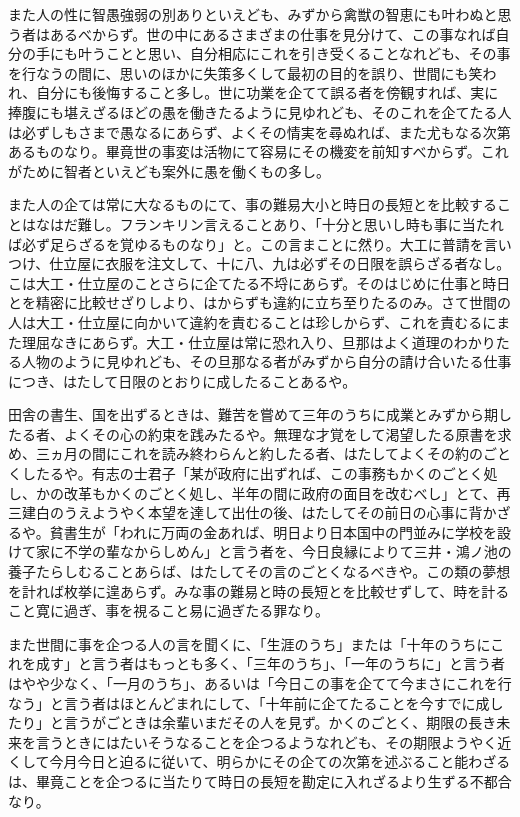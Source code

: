 \documentclass[a4paper, platex, dvipdfmx]{jsarticle}
\begin{document}
また人の性に智愚強弱の別ありといえども、みずから禽獣の智恵にも叶わぬと思う者はあるべからず。世の中にあるさまざまの仕事を見分けて、この事なれば自分の手にも叶うことと思い、自分相応にこれを引き受くることなれども、その事を行なうの間に、思いのほかに失策多くして最初の目的を誤り、世間にも笑われ、自分にも後悔すること多し。世に功業を企てて誤る者を傍観すれば、実に捧腹にも堪えざるほどの愚を働きたるように見ゆれども、そのこれを企てたる人は必ずしもさまで愚なるにあらず、よくその情実を尋ぬれば、また尤もなる次第あるものなり。畢竟世の事変は活物にて容易にその機変を前知すべからず。これがために智者といえども案外に愚を働くもの多し。

また人の企ては常に大なるものにて、事の難易大小と時日の長短とを比較することはなはだ難し。フランキリン言えることあり、「十分と思いし時も事に当たれば必ず足らざるを覚ゆるものなり」と。この言まことに然り。大工に普請を言いつけ、仕立屋に衣服を注文して、十に八、九は必ずその日限を誤らざる者なし。こは大工・仕立屋のことさらに企てたる不埒にあらず。そのはじめに仕事と時日とを精密に比較せざりしより、はからずも違約に立ち至りたるのみ。さて世間の人は大工・仕立屋に向かいて違約を責むることは珍しからず、これを責むるにまた理屈なきにあらず。大工・仕立屋は常に恐れ入り、旦那はよく道理のわかりたる人物のように見ゆれども、その旦那なる者がみずから自分の請け合いたる仕事につき、はたして日限のとおりに成したることあるや。

田舎の書生、国を出ずるときは、難苦を嘗めて三年のうちに成業とみずから期したる者、よくその心の約束を践みたるや。無理な才覚をして渇望したる原書を求め、三ヵ月の間にこれを読み終わらんと約したる者、はたしてよくその約のごとくしたるや。有志の士君子「某が政府に出ずれば、この事務もかくのごとく処し、かの改革もかくのごとく処し、半年の間に政府の面目を改むべし」とて、再三建白のうえようやく本望を達して出仕の後、はたしてその前日の心事に背かざるや。貧書生が「われに万両の金あれば、明日より日本国中の門並みに学校を設けて家に不学の輩なからしめん」と言う者を、今日良縁によりて三井・鴻ノ池の養子たらしむることあらば、はたしてその言のごとくなるべきや。この類の夢想を計れば枚挙に遑あらず。みな事の難易と時の長短とを比較せずして、時を計ること寛に過ぎ、事を視ること易に過ぎたる罪なり。

また世間に事を企つる人の言を聞くに、「生涯のうち」または「十年のうちにこれを成す」と言う者はもっとも多く、「三年のうち」、「一年のうちに」と言う者はやや少なく、「一月のうち」、あるいは「今日この事を企てて今まさにこれを行なう」と言う者はほとんどまれにして、「十年前に企てたることを今すでに成したり」と言うがごときは余輩いまだその人を見ず。かくのごとく、期限の長き未来を言うときにはたいそうなることを企つるようなれども、その期限ようやく近くして今月今日と迫るに従いて、明らかにその企ての次第を述ぶること能わざるは、畢竟ことを企つるに当たりて時日の長短を勘定に入れざるより生ずる不都合なり。
\end{document}
